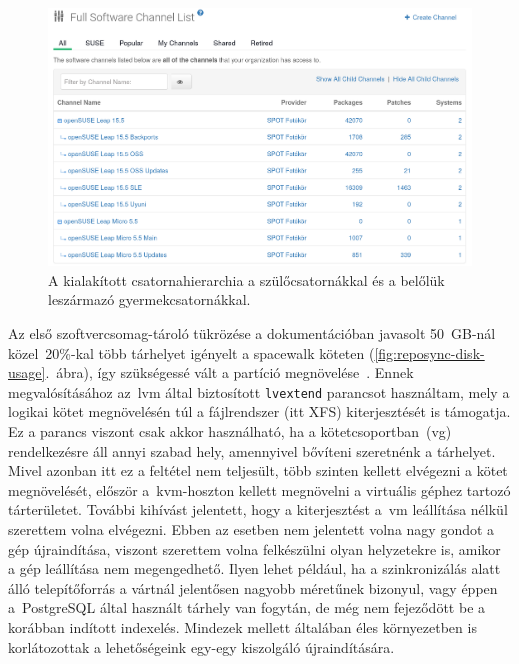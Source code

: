 \begin{figure}[ht]
	\centering
	\includegraphics[width=15cm]{figures/uyuni-channel-hierarchy.png}
	\caption{A kialakított csatornahierarchia a szülőcsatornákkal és a belőlük leszármazó gyermekcsatornákkal.}
	\label{fig:software-channel-hierarchy}
\end{figure}

Az első szoftvercsomag-tároló tükrözése a dokumentációban javasolt 50~GB-nál közel~20\%-kal több tárhelyet igényelt a spacewalk köteten (\ref{fig:reposync-disk-usage}.~ábra), így szükségessé vált a partíció megnövelése~\cite{UyuniInstallGuide}. Ennek megvalósításához az~\acrshort{lvm} által biztosított \texttt{lvextend} parancsot használtam, mely a logikai kötet megnövelésén túl a fájlrendszer (itt XFS) kiterjesztését is támogatja. Ez a parancs viszont csak akkor használható, ha a kötetcsoportban~(\acrshort{vg}) rendelkezésre áll annyi szabad hely, amennyivel bővíteni szeretnénk a tárhelyet. Mivel azonban itt ez a feltétel nem teljesült, több szinten kellett elvégezni a kötet megnövelését, először a~\acrshort{kvm}-hoszton kellett megnövelni a virtuális géphez tartozó tárterületet. További kihívást jelentett, hogy a kiterjesztést a~\acrshort{vm} leállítása nélkül szerettem volna elvégezni. Ebben az esetben nem jelentett volna nagy gondot a gép újraindítása, viszont szerettem volna felkészülni olyan helyzetekre is, amikor a gép leállítása nem megengedhető. Ilyen lehet például, ha a szinkronizálás alatt álló telepítőforrás a vártnál jelentősen nagyobb méretűnek bizonyul, vagy éppen a~PostgreSQL által használt tárhely van fogytán, de még nem fejeződött be a korábban indított indexelés. Mindezek mellett általában éles környezetben is korlátozottak a lehetőségeink egy-egy kiszolgáló újraindítására.

